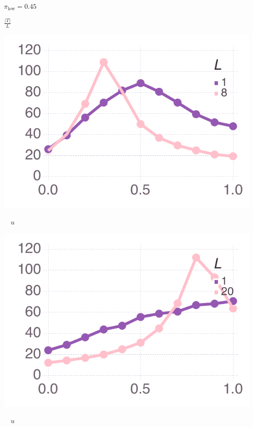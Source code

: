 \documentclass[varwidth=true,crop=false]{standalone}
\newcommand{\pisub}[1]{\pi_{\mathrm{#1}}}
\newcommand{\pilow}{\pisub{low}}
\newcommand{\meanvar}[1]{\langle #1 \rangle}
\newcommand{\meanT}{\meanvar{T}}
\begin{document}
    \begin{minipage}{3.75in}
    \begin{rotate}{90}
      {\parbox{2.5in}{
          \centering
          \vspace{-2.5em} {\huge$ \pilow = 0.45$} \\
          {\begin{rotate}{-90}{\huge $\frac{\meanT}{L}$}\hspace{3em}\end{rotate}}
      }}
    \end{rotate}%
    \hspace{2em}
      \includegraphics[width=\textwidth]{Figures/step_over_u_lowpayoff=0.45_nbehaviors=2.pdf}
        \\[-2.75em]
        \begin{center}
          {\hspace{3.25em} \huge $\quad u$}
      \end{center}
        \end{minipage}\noindent\begin{minipage}{3.75in}%
      \includegraphics[width=\textwidth]{Figures/step_over_u_lowpayoff=0.45_nbehaviors=10.pdf}
      \\[-2.75em]
      \begin{center}
        {\huge $\quad u$}
      \end{center}
    \end{minipage}
\end{document}
